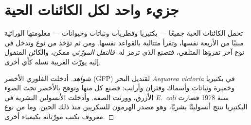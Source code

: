\section{جزيء واحد لكل الكائنات الحية}

\begin{proposition}\label{prop:g10:universal-dna:universal}
تحمل الكائنات الحية جميعًا --- بكتيريا وفطريات ونباتات وحيوانات ---
معلومتها الوراثية  مبنيًا من  الأربعة نفسها، وتقرأ
متتالية  بالقواعد نفسها. ومن ثم  تؤخذ من نوع وتدخل في
 نوع آخر تقرؤها  المتلقي، فتصنع  الذي ترمز له:
\emph{فالنقل المورّثي} ممكن، والكائن المنقول إليه
يورّث  الغريبة نسله كأي  أخرى.
\end{proposition}
\begin{proof}[شواهد]
أدخلت   الفلوري الأخضر (GFP) لقنديل البحر
\emph{Aequorea victoria} في بكتيريا وخميرة ونباتات وأسماك وفئران
وأرانب: فصنع كل منها  وتوهج بالأخضر تحت الضوء الأزرق، وورثت
الصفة. وأدخلت  الأنسولين البشرية في \emph{E.~coli} سنة 1978
فصارت البكتيريا تنتج أنسولينًا بشريًا، وهو مصدر الهرمون للسكريين منذ
ذلك الحين. وما من نوع معروف تكتب مورّثاته بكيمياء أخرى.
\end{proof}

